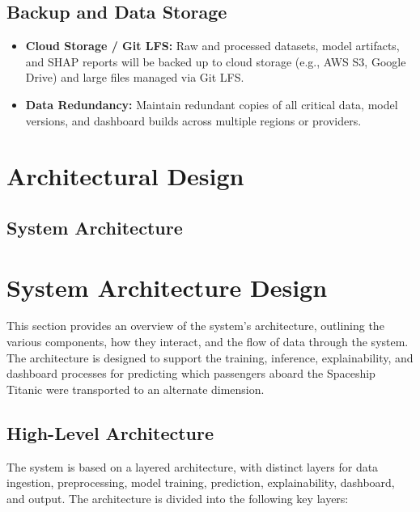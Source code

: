\documentclass[15pt]{article}
\begin{document}
\subsection{Backup and Data Storage}

\begin{itemize}
    \item \textbf{Cloud Storage / Git LFS:} Raw and processed datasets, model artifacts, and SHAP reports will be backed up to cloud storage (e.g., AWS S3, Google Drive) and large files managed via Git LFS.
    \item \textbf{Data Redundancy:} Maintain redundant copies of all critical data, model versions, and dashboard builds across multiple regions or providers.
\end{itemize}

\section{Architectural Design}

\subsection{System Architecture}
\section{System Architecture Design}

This section provides an overview of the system’s architecture, outlining the various components, how they interact, and the flow of data through the system. The architecture is designed to support the training, inference, explainability, and dashboard processes for predicting which passengers aboard the Spaceship Titanic were transported to an alternate dimension.

\subsection{High-Level Architecture}

The system is based on a layered architecture, with distinct layers for data ingestion, preprocessing, model training, prediction, explainability, dashboard, and output. The architecture is divided into the following key layers:
\end{document}

